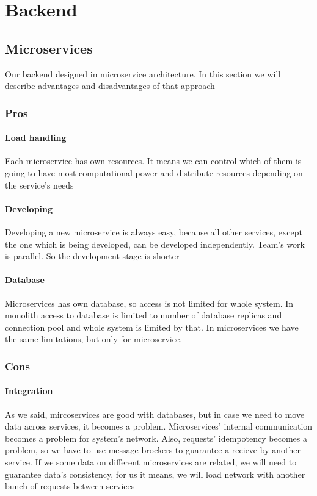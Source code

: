 \chapter{Backend}\label{ch:backend}
\section{Microservices}
Our backend designed in microservice architecture. In this section we will describe advantages and disadvantages of that approach
	\subsection{Pros}
		\subsubsection{Load handling}
		Each microservice has own resources. It means we can control which of them is going to have most computational power and distribute resources depending on the service's needs
		\subsubsection{Developing}
		Developing a new microservice is always easy, because all other services, except the one which is being developed, can be developed independently. Team's work is parallel. So the development stage is shorter
		\subsubsection{Database}
		Microservices has own database, so access is not limited for whole system. In monolith access to database is limited to number of database replicas and connection pool and whole system is limited by that. In microservices we have the same limitations, but only for microservice.
	\subsection{Cons}
		\subsubsection{Integration}
		As we said, mircoservices are good with databases, but in case we need to move data across services, it becomes a problem. Microservices' internal communication becomes a problem for system's network. Also, requests' idempotency becomes a problem, so we have to use message brockers to guarantee a recieve by another service. If we some data on different microservices are related, we will need to guarantee data's consistency, for us it means, we will load network with another bunch of requests between services
